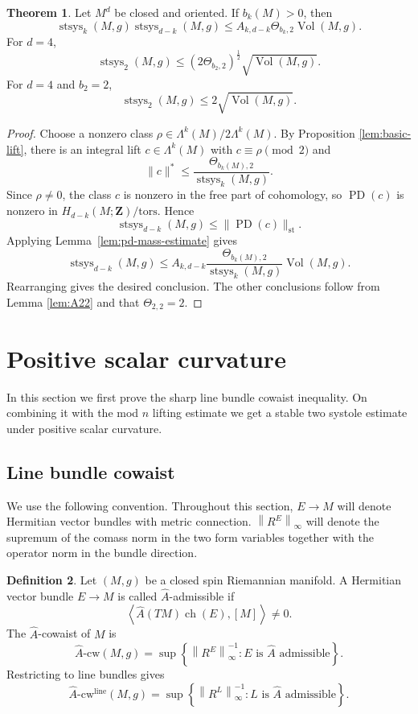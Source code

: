 \documentclass[11pt,reqno]{amsart}
\numberwithin{equation}{section}
\numberwithin{equation}{section}
\theoremstyle{definition}
\newtheorem{theorem}{Theorem}[section]
\newtheorem{definition}[theorem]{Definition}
\newcommand{\Z}{\mathbf Z}
\DeclareMathOperator{\Vol}{Vol}
\DeclareMathOperator{\stsys}{stsys}
\DeclareMathOperator{\ch}{ch}
\newcommand{\Ah}{\widehat A}
\newcommand{\Ahcw}{\widehat A\text{-}\mathrm{cw}}
\newcommand{\Ahcwline}{\widehat A\text{-}\mathrm{cw}^{\mathrm{line}}}
\newcommand{\norm}[1]{\left\lVert #1\right\rVert}
\newcommand{\ip}[2]{\left\langle #1,#2\right\rangle}
\begin{document}
\begin{theorem}\label{prop:PD}
Let \(M^d\) be closed and oriented. If \(b_k(M)>0\), then
\[
\stsys_k(M,g)\stsys_{d-k}(M,g)
\le
A_{k,d-k}\Theta_{b_k,2}\Vol(M,g).
\]
For $d=4$,
\[
\stsys_2(M,g)
\le
(2 \Theta_{b_2,2})^{\frac{1}{2}}\sqrt{\Vol(M,g)}.
\]
For $d=4$ and $b_2=2$,
\[\stsys_2(M,g)
\le
2\sqrt{\Vol(M,g)}.\]
\end{theorem}

\begin{proof}
Choose a nonzero class \(\rho\in \Lambda^k(M)/2\Lambda^k(M)\). By Proposition \ref{lem:basic-lift}, there is an integral lift \(c\in\Lambda^k(M)\) with \(c\equiv\rho\pmod2\) and
\[
\|c\|^*
\le
\frac{\Theta_{b_k(M),2}}{\operatorname{stsys}_k(M,g)}.
\]
Since \(\rho\neq0\), the class \(c\) is nonzero in the free part of cohomology, so \(\operatorname{PD}(c)\) is nonzero in \(H_{d-k}(M;\Z)/\mathrm{tors}\). Hence
\[
\operatorname{stsys}_{d-k}(M,g)
\le
\|\operatorname{PD}(c)\|_{\mathrm{st}}.
\]
Applying Lemma~\ref{lem:pd-mass-estimate} gives
\[
\operatorname{stsys}_{d-k}(M,g)
\le
A_{k,d-k}
\frac{\Theta_{b_k(M),2}}{\operatorname{stsys}_k(M,g)}
\operatorname{Vol}(M,g).
\]
Rearranging gives the desired conclusion. The other conclusions follow from Lemma \ref{lem:A22} and that $\Theta_{2,2}=2$.
\end{proof}


\section{Positive scalar curvature}
\label{sec:positive-scalar-curvature}

In this section we first prove the sharp line bundle cowaist inequality. On combining it with the mod \(n\) lifting estimate we get a stable two systole estimate under positive scalar curvature.

\subsection{Line bundle cowaist}

We use the following convention. Throughout this section, \(E\to M\) will denote Hermitian vector bundles with metric connection. \(\norm{R^E}_\infty\) will denote the supremum of the comass norm in the two form variables together with the operator norm in the bundle direction.

\begin{definition}\label{def:Ah-cowaist}
Let \((M,g)\) be a closed spin Riemannian manifold. A Hermitian vector bundle \(E\to M\) is called \(\Ah\)-admissible if
\[
\ip{\Ah(TM)\ch(E)}{[M]}\neq0.
\]
The \(\Ah\)-cowaist of \(M\) is
\[
\Ahcw(M,g)
=
\sup \left\{
\norm{R^E}_\infty^{-1} :
E \text{ is } \Ah\text{ admissible} 
\right\}.
\]
Restricting to line bundles gives
\[
\Ahcwline(M,g)
=
\sup \left\{
\norm{R^L}_\infty^{-1} :
L \text{ is } \Ah\text{ admissible} 
\right\}.
\]
\end{definition}
\end{document}
